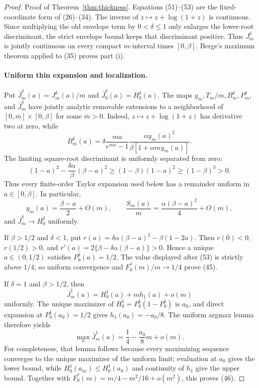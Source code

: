 \documentclass[mnsc,blindrev]{informs3}
\begin{document}
\begin{proof}{Proof of Theorem~\ref{thm:thickness}.}
Equations (51)--(53) are the fixed-coordinate form of (26)--(34).  The
inverse of $z\mapsto z+\log(1+z)$ is continuous.  Since multiplying the old
envelope term by $0<\delta\le1$ only enlarges the lower-root discriminant,
the strict envelope bound keeps that discriminant positive.  Thus
$J_m^\delta$ is jointly continuous on every compact $m$-interval times
$[0,\beta]$.  Berge's maximum theorem applied to (35) proves part (i).

\paragraph{Uniform thin expansion and localization.}
Put $\bar J_m^\delta(a)=J_m^\delta(a)/m$ and
$\bar J_0^\delta(a)=H_0^\delta(a)$.  The maps
$y_m,T_m/m,B_m^\delta,P_m^\delta$, and $\bar J_m^\delta$ have jointly
analytic removable extensions to a neighborhood of
$[0,\bar m]\times[0,\beta]$ for some $\bar m>0$.  Indeed,
$z\mapsto z+\log(1+z)$ has derivative two at zero, while
\[
 B_m^\delta(a)=\delta\frac{ma}{e^{ma}-1}
 \frac{\alpha y_m(a)^2}{\beta[1+\alpha m y_m(a)]}.
\]
The limiting square-root discriminant is uniformly separated from zero:
\[
 (1-a)^2-\frac{\delta\alpha}{\beta}(\beta-a)^2
 \ge(1-\beta)(1-a)^2\ge(1-\beta)^3>0.
\]
Thus every finite-order Taylor expansion used below has a remainder uniform
in $a\in[0,\beta]$.  In particular,
\[
 y_m(a)=\frac{\beta-a}{2}+O(m),\qquad
 \frac{S_m(a)}m=\frac{\alpha(\beta-a)^2}{4}+O(m),
\]
and $\bar J_m^\delta\to H_0^\delta$ uniformly.

If $\beta>1/2$ and $\delta<1$, put
$r(a)=\delta\alpha(\beta-a)^2-\beta(1-2a)$.  Then
$r(0)<0$, $r(1/2)>0$, and
$r'(a)=2\{\beta-\delta\alpha(\beta-a)\}>0$.  Hence a unique
$a\in(0,1/2)$ satisfies $P_0^\delta(a)=1/2$.  The value displayed after (53)
is strictly above $1/4$, so uniform convergence and
$F_0^*(m)/m\to1/4$ prove (45).

If $\delta=1$ and $\beta>1/2$, then
\[
 \bar J_m^1(a)=H_0^1(a)+m h_1(a)+o(m)
\]
uniformly.  The unique maximizer of
$H_0^1=P_0^1(1-P_0^1)$ is $a_0$, and direct expansion at
$P_0^1(a_0)=1/2$ gives $h_1(a_0)=-a_0/8$.  The uniform argmax lemma therefore
yields
\[
 \max_a\bar J_m^1(a)=\frac14-\frac{a_0}{8}m+o(m).
\]
For completeness, that lemma follows because every maximizing sequence
converges to the unique maximizer of the uniform limit; evaluation at $a_0$
gives the lower bound, while $H_0^1(a_m)\le H_0^1(a_0)$ and continuity of
$h_1$ give the upper bound.  Together with
$F_0^*(m)=m/4-m^2/16+o(m^2)$, this proves (46).


\end{proof}
\end{document}
